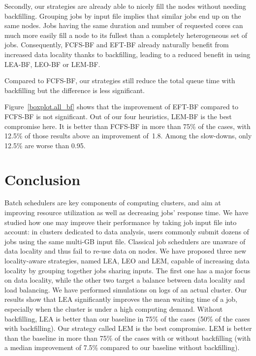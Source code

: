 \documentclass[conference]{IEEEtran}
\begin{document}
Secondly, our strategies are already able to nicely fill the nodes without needing backfilling.
Grouping jobs by input file implies that similar jobs end up on the same nodes.
Jobs having the same duration and number of requested cores can much more easily fill a node to its fullest than a completely heterogeneous set of jobs.
Consequently, FCFS-BF and EFT-BF already naturally benefit from increased data locality thanks to backfilling, leading to a reduced benefit in using LEA-BF, LEO-BF or LEM-BF.

Compared to FCFS-BF, our strategies still reduce the total queue time with backfilling but the difference is less significant.

Figure~\ref{boxplot.all_bf} shows that the improvement of EFT-BF compared to FCFS-BF is not significant.
Out of our four heuristics, LEM-BF is the best compromise here.
It is better than FCFS-BF in more than 75\% of the cases, 
with 12.5\% of those results above an improvement of~1.8.
Among the slow-downs, only 12.5\% are worse than 0.95.

\section{Conclusion}\label{sec.conclusion}

Batch schedulers are key components of computing clusters, and aim at
improving resource utilization as well as decreasing jobs' response
time. We have studied how one may improve their performance by taking
job input file into account: in clusters dedicated to data analysis,
users commonly submit dozens of jobs using the same multi-GB input
file. Classical job schedulers are unaware of data locality and thus
fail to re-use data on nodes. We have proposed three new locality-aware
strategies, named LEA, LEO and LEM,
capable of increasing data locality by grouping together 
jobs sharing inputs. The first one has a major focus on data locality,
while the other two target a balance between data locality and load
balancing. We have performed simulations on logs of an actual
cluster. Our results show that LEA significantly improves the mean
waiting time of a job, especially  
when the cluster is under a high computing demand.
Without backfilling, LEA is better than our baseline in 75\% of the
cases (50\% of the cases with backfilling).
Our strategy called LEM is the best compromise. LEM is better than the baseline in more than 75\% of the cases with or without backfilling
(with a median improvement of 7.5\% compared to our baseline without backfilling).
\end{document}
